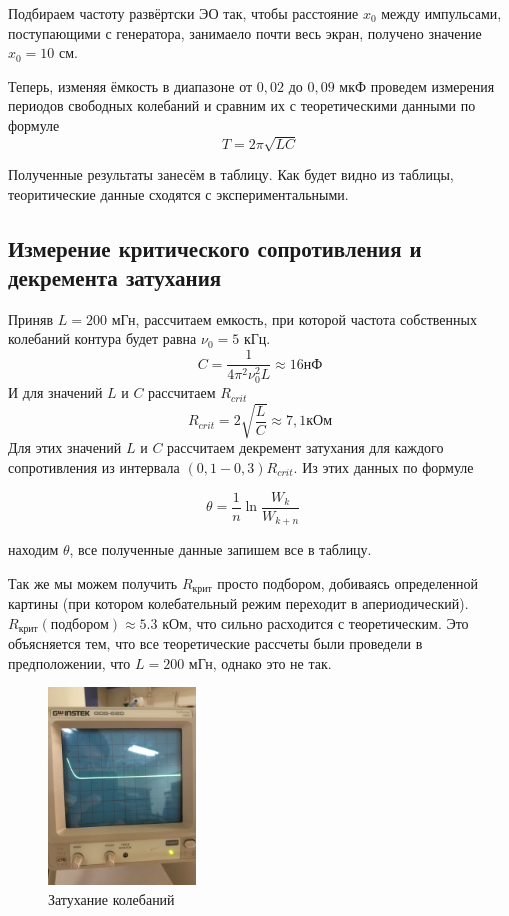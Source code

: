 \documentclass[a4paper, 12pt]{article}%
\begin{document}
Подбираем частоту развёртски ЭО так, чтобы расстояние $x_0$ между импульсами, поступающими с генератора, занимаело почти весь экран, получено значение $x_0 = 10$ см. 

Теперь, изменяя ёмкость в диапазоне от $0,02$ до $0,09$ мкФ проведем измерения периодов свободных колебаний и сравним их с теоретическими данными по формуле 
\[T = 2 \pi \sqrt{LC}\]

Полученные результаты занесём в таблицу. Как будет видно из таблицы, теоритические данные сходятся с экспериментальными.

\subsection{Измерение критического сопротивления и декремента затухания}

Приняв $L = 200$ мГн, рассчитаем емкость, при которой частота собственных колебаний контура будет равна $\nu_0 = 5$ кГц.
\[C = \dfrac{1}{4 \pi^2 \nu_0^2 L} \approx 16 \text{нФ}\]
И для значений $L$ и $C$ рассчитаем $R_{crit}$
\[R_{crit} = 2\sqrt{\dfrac{L}{C}} \approx 7,1 \text{кОм}\]
Для этих значений $L$ и $C$ рассчитаем декремент затухания для каждого сопротивления из интервала $(0,1-0,3)R_{crit}$. Из этих данных по формуле
 
\[\theta = \frac{1}{n} \ln\frac{W_k}{W_{k+n}} \quad  \]

находим $\theta$, все полученные данные запишем все в таблицу. 

Так же мы можем получить $R_{\text{крит}}$ просто подбором, добиваясь определенной картины (при котором колебательный режим переходит в апериодический). $R_{\text{крит}} (\text{подбором}) \approx 5.3$ кОм, что сильно расходится с теоретическим. Это объясняется тем, что все теоретические рассчеты были проведели в предположении, что $L = 200$ мГн, однако это не так.

\begin{figure}[h]
\begin{center}
\includegraphics[width = 0.35\textwidth]{2.jpg}
\caption{Затухание колебаний}
\end{center}
\end{figure}
\end{document}
